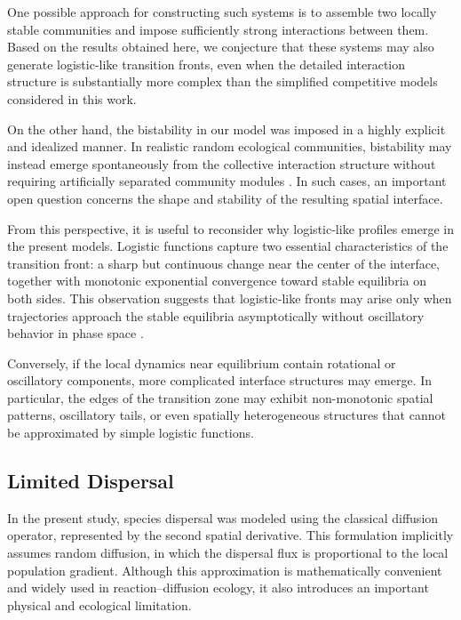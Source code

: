 One possible approach for constructing such systems is to assemble two locally stable communities and impose sufficiently strong interactions between them. Based on the results obtained here, we conjecture that these systems may also generate logistic-like transition fronts, even when the detailed interaction structure is substantially more complex than the simplified competitive models considered in this work.

On the other hand, the bistability in our model was imposed in a highly explicit and idealized manner. In realistic random ecological communities, bistability may instead emerge spontaneously from the collective interaction structure without requiring artificially separated community modules \citep{maynard_network_2018,song_will_2018,angulo_coexistence_2021}. In such cases, an important open question concerns the shape and stability of the resulting spatial interface.

From this perspective, it is useful to reconsider why logistic-like profiles emerge in the present models. Logistic functions capture two essential characteristics of the transition front: a sharp but continuous change near the center of the interface, together with monotonic exponential convergence toward stable equilibria on both sides. This observation suggests that logistic-like fronts may arise only when trajectories approach the stable equilibria asymptotically without oscillatory behavior in phase space \citep{rosen_effects_1977, hou_traveling_2008}.

Conversely, if the local dynamics near equilibrium contain rotational or oscillatory components, more complicated interface structures may emerge. In particular, the edges of the transition zone may exhibit non-monotonic spatial patterns, oscillatory tails, or even spatially heterogeneous structures that cannot be approximated by simple logistic functions.

\subsection{Limited Dispersal}

In the present study, species dispersal was modeled using the classical diffusion operator, represented by the second spatial derivative. This formulation implicitly assumes random diffusion, in which the dispersal flux is proportional to the local population gradient. Although this approximation is mathematically convenient and widely used in reaction--diffusion ecology, it also introduces an important physical and ecological limitation.

